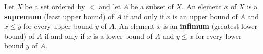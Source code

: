 Let $X$ be a set ordered by $<$ and let $A$ be a subset of $X$. An element $x$ of $X$ is a \textbf{supremum} (least upper bound) of $A$ if and only if $x$ is an upper bound of $A$ and $x \leq y$ for every upper bound $y$ of $A$. An element $x$ is an \textbf{infimum} (greatest lower bound) of $A$ if and only if $x$ is a lower bound of $A$ and $y \leq x$ for every lower bound $y$ of $A$.
